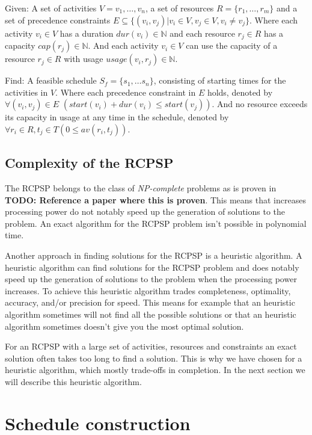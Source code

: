 \documentclass{article}
\theoremstyle{definition}
\newcommand{\TODO}[1]{{\color{red}\textbf{TODO: #1}}}
\newcommand{\av}[2]{\ensuremath{av(r_{#1}, t_{#2})}} %
\newcommand{\capa}[1]{\ensuremath{cap(r_{#1})}} %
\newcommand{\dur}[1]{\ensuremath{dur(v_{#1})}} %
\newcommand{\usage}[2]{\ensuremath{usage(v_{#1}, r_{#2})}} %
\newcommand{\start}[1]{\ensuremath{start(v_{#1})}} %
\newenvironment{definition}[1][Definition]{\begin{trivlist}
\item[\hskip \labelsep {\bfseries #1}]}{\end{trivlist}}
\begin{document}
\begin{definition}
Given:
A set of activities $V = v_1, \ldots, v_n$, a set of resources $R = \{r_1, \ldots, r_m\}$ and a set of precedence constraints $E \subseteq  \{(v_i, v_j) | v_i \in V, v_j \in V, v_i \neq v_j\}$.
Where each activity $v_i \in V$ has a duration $\dur{i} \in \mathbb{N}$ and each resource $r_j \in R$ has a capacity $\capa{j} \in \mathbb{N}$. 
And each activity $v_i \in V$ can use the capacity of a resource $r_j \in R$ with usage $\usage{i}{j} \in \mathbb{N}$.

Find:
A feasible schedule $S_f = \{s_1, \ldots s_n\}$, consisting of starting times for the activities in $V$.
Where each precedence constraint in $E$ holds, denoted by $\forall (v_i, v_j) \in E$ $(\start{i} + \dur{i} \leq \start{j})$.
And no resource exceeds its capacity in usage at any time in the schedule, denoted by $\forall r_i \in R, t_j \in T (0 \leq \av{i}{j})$.
\end{definition}


\subsection{Complexity of the RCPSP}
\label{text:complex}
The RCPSP belongs to the class of \emph{NP-complete} problems as is proven in \TODO{Reference a paper where this is proven}.
This means that increases processing power do not notably speed up the generation of solutions to the problem.
An exact algorithm for the RCPSP problem isn't possible in polynomial time.

Another approach in finding solutions for the RCPSP is a heuristic algorithm.
A heuristic algorithm can find solutions for the RCPSP problem and does notably speed up the generation of solutions to the problem when the processing power increases.
To achieve this heuristic algorithm trades completeness, optimality, accuracy, and/or precision for speed.
This means for example that an heuristic algorithm sometimes will not find all the possible solutions or that an heuristic algorithm sometimes doesn't give you the most optimal solution.

For an RCPSP with a large set of activities, resources and constraints an exact solution often takes too long to find a solution.
This is why we have chosen for a heuristic algorithm, which mostly trade-offs in completion.
In the next section we will describe this heuristic algorithm.


\newpage


\section{Schedule construction}
\label{text:schedule}
\end{document}
